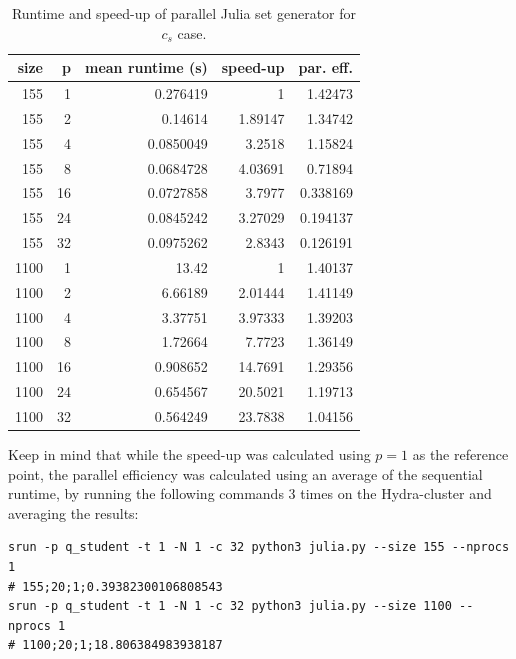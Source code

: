 \documentclass[a4paper,%
11pt,%
DIV12,
headsepline,%
headings=normal,
]{scrartcl}
\begin{document}
\begin{table}[htb!]
 \centering 
\caption{\label{tab:runtime_cs}Runtime and speed-up of parallel Julia set generator for $c_s$ case.}
\begin{tabular}{rrrrr}
  \toprule
  size & p & mean runtime (s) & speed-up & par. eff.\\
  \midrule
  155 & 1 & 0.276419 & 1 & 1.42473 \\
  155 & 2 & 0.14614 & 1.89147 & 1.34742 \\
  155 & 4 & 0.0850049 & 3.2518 & 1.15824 \\
  155 & 8 & 0.0684728 & 4.03691 & 0.71894 \\
  155 & 16 & 0.0727858 & 3.7977 & 0.338169 \\
  155 & 24 & 0.0845242 & 3.27029 & 0.194137 \\
  155 & 32 & 0.0975262 & 2.8343 & 0.126191 \\
  \midrule
  1100 & 1 & 13.42 & 1 & 1.40137 \\
  1100 & 2 & 6.66189 & 2.01444 & 1.41149 \\
  1100 & 4 & 3.37751 & 3.97333 & 1.39203 \\
  1100 & 8 & 1.72664 & 7.7723 & 1.36149 \\
  1100 & 16 & 0.908652 & 14.7691 & 1.29356 \\
  1100 & 24 & 0.654567 & 20.5021 & 1.19713 \\
  1100 & 32 & 0.564249 & 23.7838 & 1.04156 \\
  \bottomrule
\end{tabular}
\end{table}

Keep in mind that while the speed-up was calculated using $p=1$ as the reference point, the parallel efficiency was calculated using an average of the sequential runtime, by running the following commands 3 times on the Hydra-cluster and averaging the results:

\begin{verbatim}
srun -p q_student -t 1 -N 1 -c 32 python3 julia.py --size 155 --nprocs 1 
# 155;20;1;0.39382300106808543
srun -p q_student -t 1 -N 1 -c 32 python3 julia.py --size 1100 --nprocs 1 
# 1100;20;1;18.806384983938187
\end{verbatim}
\end{document}
